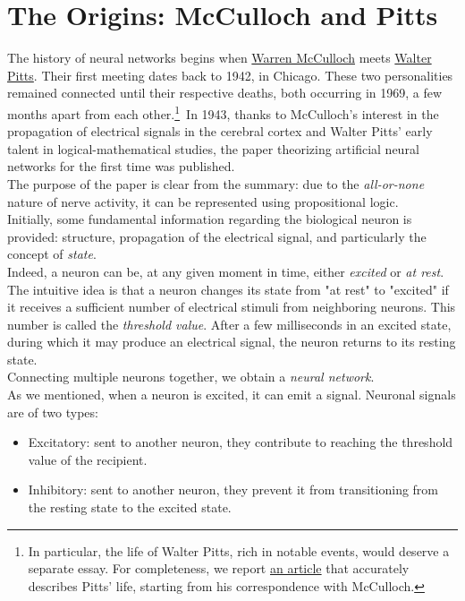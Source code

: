 \documentclass[10pt]{article}
\begin{document}
\section{The Origins: McCulloch and Pitts}\label{ch: origins}
The history of neural networks begins when \href{https://en.wikipedia.org/wiki/Warren_Sturgis_McCulloch}{Warren McCulloch} meets \href{https://en.wikipedia.org/wiki/Walter_Pitts}{Walter Pitts}. Their first meeting dates back to 1942, in Chicago. These two personalities remained connected until their respective deaths, both occurring in 1969, a few months apart from each other.\footnote{In particular, the life of Walter Pitts, rich in notable events, would deserve a separate essay. For completeness, we report \href{http://nautil.us/issue/21/information/the-man-who-tried-to-redeem-the-world-with-logic}{an article} that accurately describes Pitts' life, starting from his correspondence with McCulloch.}\
In 1943, thanks to McCulloch's interest in the propagation of electrical signals in the cerebral cortex and Walter Pitts' early talent in logical-mathematical studies, the paper theorizing artificial neural networks for the first time was published\cite{McCulloch1943}.\\
The purpose of the paper is clear from the summary: due to the \emph{all-or-none} nature of nerve activity, it can be represented using propositional logic.\\
Initially, some fundamental information regarding the biological neuron is provided: structure, propagation of the electrical signal, and particularly the concept of \emph{state}.\\
Indeed, a neuron can be, at any given moment in time, either \emph{excited} or \emph{at rest}. The intuitive idea is that a neuron changes its state from "at rest" to "excited" if it receives a sufficient number of electrical stimuli from neighboring neurons. This number is called the \emph{threshold value}. After a few milliseconds in an excited state, during which it may produce an electrical signal, the neuron returns to its resting state.\\
Connecting multiple neurons together, we obtain a \emph{neural network}.\\
As we mentioned, when a neuron is excited, it can emit a signal. Neuronal signals are of two types:
\begin{itemize}
	\item Excitatory: sent to another neuron, they contribute to reaching the threshold value of the recipient.
	\item Inhibitory: sent to another neuron, they prevent it from transitioning from the resting state to the excited state.
\end{itemize}
\end{document}
